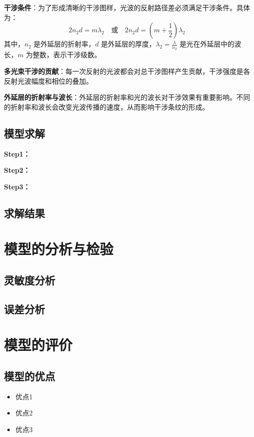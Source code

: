 \documentclass{cumcmthesis}
\begin{document}
\textbf{干涉条件}：为了形成清晰的干涉图样，光波的反射路径差必须满足干涉条件。具体为：
	\[
	2 n_2 d = m \lambda_2 \quad \text{或} \quad 2 n_2 d = \left( m + \frac{1}{2} \right) \lambda_2
	\]
	其中，\( n_2 \) 是外延层的折射率，\( d \) 是外延层的厚度，\( \lambda_2 = \frac{\lambda}{n_2} \) 是光在外延层中的波长，\( m \) 为整数，表示干涉级数。

\textbf{多光束干涉的贡献}：每一次反射的光波都会对总干涉图样产生贡献，干涉强度是各反射光波幅度和相位的叠加。

\textbf{外延层的折射率与波长}：外延层的折射率和光的波长对干涉效果有重要影响。不同的折射率和波长会改变光波传播的速度，从而影响干涉条纹的形成。

\subsection{模型求解}

\textbf{Step1：} 

\textbf{Step2：} 

\textbf{Step3：} 

\subsection{求解结果}



\section{模型的分析与检验}

\subsection{灵敏度分析}

\subsection{误差分析}


\section{模型的评价}

\subsection{模型的优点}
\begin{itemize}[itemindent=2em]
\item 优点1
\item 优点2
\item 优点3
\end{itemize}
\end{document}
